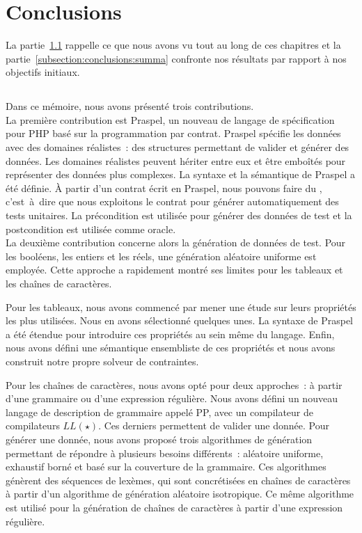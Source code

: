 \section{Conclusions}
\label{section:conclusions:conclusions}

La partie~\ref{subsection:conclusions:recapitulare} rappelle ce que nous avons
vu tout au long de ces chapitres et la partie~\ref{subsection:conclusions:summa}
confronte nos résultats par rapport à nos objectifs initiaux.

\subsection{}
\label{subsection:conclusions:recapitulare}

Dans ce mémoire, nous avons présenté trois contributions. \\

La première contribution est Praspel, un nouveau de langage de spécification
pour PHP basé sur la programmation par contrat. Praspel spécifie les données
avec des domaines réalistes~: des structures permettant de valider et générer
des données. Les domaines réalistes peuvent hériter entre eux et être emboîtés
pour représenter des données plus complexes. La syntaxe et la sémantique de
Praspel a été définie.  À partir d'un contrat écrit en Praspel, nous pouvons
faire du , c'est~à~dire que nous exploitons le
contrat pour générer automatiquement des tests unitaires. La précondition est
utilisée pour générer des données de test et la postcondition est utilisée comme
oracle.  \\

La deuxième contribution concerne alors la génération de données de test. Pour
les booléens, les entiers et les réels, une génération aléatoire uniforme est
employée. Cette approche a rapidement montré ses limites pour les tableaux et
les chaînes de caractères.

Pour les tableaux, nous avons commencé par mener une étude sur leurs propriétés
les plus utilisées. Nous en avons sélectionné quelques unes. La syntaxe de
Praspel a été étendue pour introduire ces propriétés au sein même du langage.
Enfin, nous avons défini une sémantique ensembliste de ces propriétés et nous
avons construit notre propre solveur de contraintes.

Pour les chaînes de caractères, nous avons opté pour deux approches~: à partir
d'une grammaire ou d'une expression régulière. Nous avons défini un nouveau
langage de description de grammaire appelé PP, avec un compilateur de
compilateurs $LL(\star)$. Ces derniers permettent de valider une donnée. Pour
générer une donnée, nous avons proposé trois algorithmes de génération
permettant de répondre à plusieurs besoins différents~: aléatoire uniforme,
exhaustif borné et basé sur la couverture de la grammaire. Ces algorithmes
génèrent des séquences de lexèmes, qui sont concrétisées en chaînes de
caractères à partir d'un algorithme de génération aléatoire isotropique. Ce même
algorithme est utilisé pour la génération de chaînes de caractères à partir
d'une expression régulière.

